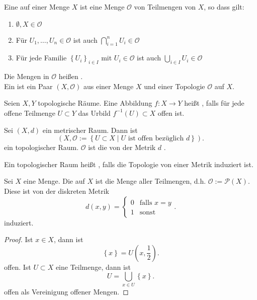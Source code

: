 \begin{definition}[Topologie]\label{def:topologie}
    Eine  auf einer Menge $X$ ist eine Menge  $\mathcal{O}$ von Teilmengen von  $X$, so dass gilt:
    \begin{enumerate}[1)]
        \item $\emptyset,X \in \mathcal{O}$
        \item Für $U_1,\ldots,U_n \in \mathcal{O}$ ist auch $\bigcap_{i=1}^n U_i \in  \mathcal{O}$
        \item Für jede Familie $\left \{U_i\right\} _{i\in I}$ mit $U_i \in \mathcal{O}$ ist auch $\bigcup_{i\in I} U_i \in  \mathcal{O}$
    \end{enumerate}
    Die Mengen in $\mathcal{O}$ heißen . \\
    Ein  ist ein Paar  $(X,\mathcal{O})$ aus einer Menge  $X$ und einer Topologie  $\mathcal{O}$ auf  $X$.
\end{definition}


\begin{definition}[Stetigkeit]\label{def:stetig}
    Seien $X,Y$ topologische Räume. Eine Abbildung  $f:X \to  Y$ heißt , falls für jede offene Teilmenge $U\subset Y$ das Urbild $f^{-1}(U) \subset X$ offen ist.
\end{definition}

\begin{example}
    Sei $(X,d)$ ein metrischer Raum. Dann ist
     \[
         (X, \mathcal{O} := \left \{U\subset X \mid  U \text{ ist offen bezüglich $d$}\right\} )
    .\] 
    ein topologischer Raum. $\mathcal{O}$ ist die von der Metrik  $d$ .
\end{example}

\begin{definition}[Metrisierbarkeit]\label{def:metrisierbar}
    Ein topologischer Raum heißt , falls die Topologie von einer Metrik induziert ist.
\end{definition}

\begin{example}
    Sei $X$ eine Menge. Die  auf $X$ ist die Menge aller Teilmengen, d.h.  $\mathcal{O} := \mathcal{P}(X)$. Diese ist von der diskreten Metrik
    \[
        d(x,y) = \begin{cases}
            0 & \text{falls }x=y \\
            1 & \text{sonst}
        \end{cases}
    .\] 
    induziert.
\end{example}
\begin{proof}
    Ist $x\in X$, dann ist
    \[
        \left \{x\right\} =U\left(x,\frac{1}{2}\right)
    .\] 
    offen. Ist $U\subset X$ eine Teilmenge, dann ist
    \[
    U = \bigcup_{x\in U} \left \{x\right\}
    .\] 
    offen als Vereinigung offener Mengen.
\end{proof}


